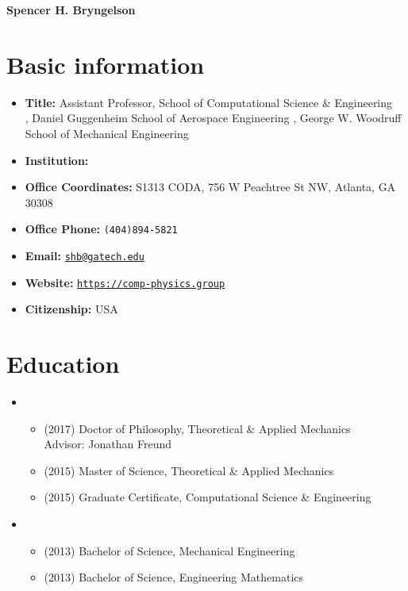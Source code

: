 




\begin{center}
    {\LARGE \bf Spencer H. Bryngelson} 
\end{center}


\section{Basic information}
\begin{itemize}
    \item[] \textbf{Title:} Assistant Professor, School of Computational Science \& Engineering \\
         \APBC, Daniel Guggenheim School of Aerospace Engineering 
         \APBC, George W. Woodruff School of Mechanical Engineering
    \item[] \textbf{Institution:} \GIT
    \item[] \textbf{Office Coordinates:} S1313 CODA, 756 W Peachtree St NW, Atlanta, GA 30308
    \item[] \textbf{Office Phone:} \texttt{(404)894-5821}
    \item[] \textbf{Email:} \href{mailto:shb@gatech.edu}{\texttt{shb@gatech.edu}}
    \item[] \textbf{Website:} \href{https://comp-physics.group}{\texttt{https://comp-physics.group}}
    \item[] \textbf{Citizenship:} USA
\end{itemize}

\section{Education}

\begin{itemize}
    \item \UIUC
    \begin{itemize}
        \item[] (2017) Doctor of Philosophy, Theoretical \& Applied Mechanics \\
            \phantom{(2017)} Advisor: Jonathan Freund
        \item[] (2015) Master of Science, Theoretical \& Applied Mechanics
        \item[] (2015) Graduate Certificate, Computational Science \& Engineering
    \end{itemize}
    \item \UMD
    \begin{itemize}
        \item[] (2013) Bachelor of Science, Mechanical Engineering
        \item[] (2013) Bachelor of Science, Engineering Mathematics
    \end{itemize}
\end{itemize}


